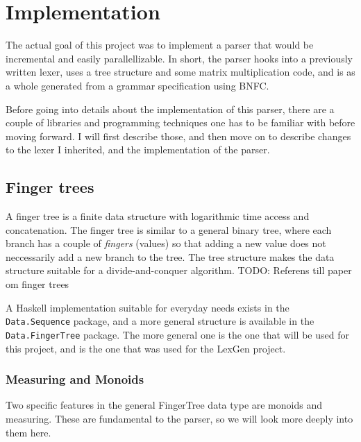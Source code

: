 \documentclass[a4paper,12pt,twosided]{report}
\begin{document}
%
%

\chapter{Implementation}
The actual goal of this project was to implement a parser that would be
incremental and easily parallellizable. In short, the parser hooks into a
previously written lexer, uses a tree structure and some matrix multiplication
code, and is as a whole generated from a grammar specification using BNFC.

Before going into details about the implementation of this parser, there are a
couple of libraries and programming techniques one has to be familiar with
before moving forward. I will first describe those, and then move on to describe
changes to the lexer I inherited, and the implementation of the parser.

\section{Finger trees}
A finger tree is a finite data structure with logarithmic time access and
concatenation. The finger tree is similar to a general binary tree, where each
branch has a couple of \textit{fingers} (values) so that adding a new value does
not neccessarily add a new branch to the tree. The tree structure makes the data
structure suitable for a divide-and-conquer algorithm. TODO: Referens till paper
om finger trees

A Haskell implementation suitable for everyday needs exists in the
\texttt{Data.Sequence} package, and a more general structure is available in the
\texttt{Data.FingerTree} package. The more general one is the one that will be
used for this project, and is the one that was used for the LexGen project.

\subsection{Measuring and Monoids}
Two specific features in the general FingerTree data type are monoids and
measuring. These are fundamental to the parser, so we will look more deeply into
them here.
\end{document}
